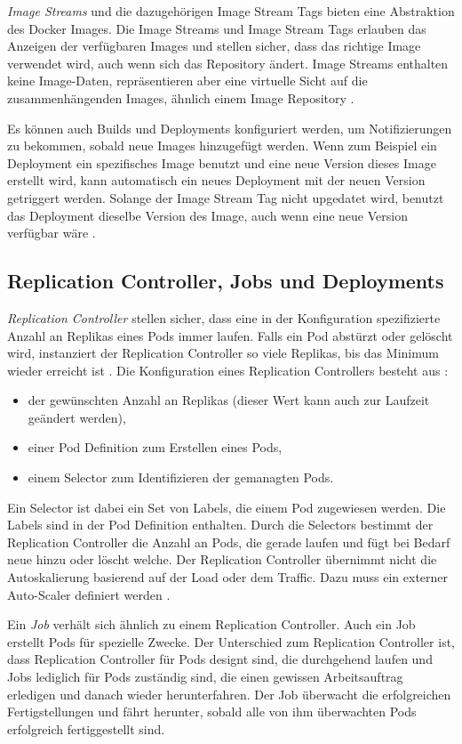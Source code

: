 \textit{Image Streams} und die dazugehörigen Image Stream Tags bieten eine Abstraktion des Docker Images. Die Image Streams und Image Stream Tags erlauben das Anzeigen der verfügbaren Images und stellen sicher, dass das richtige Image verwendet wird, auch wenn sich das Repository ändert.
Image Streams enthalten keine Image-Daten, repräsentieren aber eine virtuelle Sicht auf die zusammenhängenden Images, ähnlich einem Image Repository \cite{OpenShiftOnline}.

Es können auch Builds und Deployments konfiguriert werden, um Notifizierungen zu bekommen, sobald neue Images hinzugefügt werden.
Wenn zum Beispiel ein Deployment ein spezifisches Image benutzt und eine neue Version dieses Image erstellt wird, kann automatisch ein neues Deployment mit der neuen Version getriggert werden.
Solange der Image Stream Tag nicht upgedatet wird, benutzt das Deployment dieselbe Version des Image, auch wenn eine neue Version verfügbar wäre \cite{OpenShiftOnline}.

\subsection{Replication Controller, Jobs und Deployments}
\textit{Replication Controller} stellen sicher, dass eine in der Konfiguration spezifizierte Anzahl an Replikas eines Pods immer laufen. Falls ein Pod abstürzt oder gelöscht wird, instanziert der Replication Controller so viele Replikas, bis das Minimum wieder erreicht ist \cite{OpenShiftOnline}.
Die Konfiguration eines Replication Controllers besteht aus \cite{OpenShiftOnline}:
\begin{itemize}
	\item der gewünschten Anzahl an Replikas (dieser Wert kann auch zur Laufzeit geändert werden),
	\item einer Pod Definition zum Erstellen eines Pods,
	\item einem Selector zum Identifizieren der gemanagten Pods.
\end{itemize}
Ein Selector ist dabei ein Set von Labels, die einem Pod zugewiesen werden. Die Labels sind in der Pod Definition enthalten. Durch die Selectors bestimmt der Replication Controller die Anzahl an Pods, die gerade laufen und fügt bei Bedarf neue hinzu oder löscht welche.
Der Replication Controller übernimmt nicht die Autoskalierung basierend auf der Load oder dem Traffic. Dazu muss ein externer Auto-Scaler definiert werden \cite{OpenShiftOnline}.

Ein \textit{Job} verhält sich ähnlich zu einem Replication Controller. Auch ein Job erstellt Pods für spezielle Zwecke. Der Unterschied zum Replication Controller ist, dass Replication Controller für Pods designt sind, die durchgehend laufen und Jobs lediglich für Pods zuständig sind, die einen gewissen Arbeitsauftrag erledigen und danach wieder herunterfahren. Der Job überwacht die erfolgreichen Fertigstellungen und fährt herunter, sobald alle von ihm überwachten Pods erfolgreich fertiggestellt sind.

